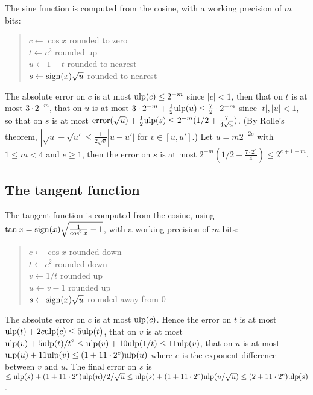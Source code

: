 \documentclass[12pt]{amsart}
\def\ulp{{\rm ulp}}
\begin{document}
The sine function is computed from the cosine, with a working precision of
$m$ bits:
\begin{quote}
$c \leftarrow \cos x$ rounded to zero \\
$t \leftarrow c^2$ rounded up \\
$u \leftarrow 1 - t$ rounded to nearest \\
$s \leftarrow {\rm sign}(x) \sqrt{u}$ rounded to nearest \\
\end{quote}
The absolute error on $c$ is at most $\ulp(c)
\le 2^{-m}$ since $|c| < 1$,
then that on
$t$ is at most $3 \cdot 2^{-m}$, that on $u$ is at most $3 \cdot 2^{-m} + 
\frac{1}{2}\ulp(u) \le \frac{7}{2} \cdot 2^{-m}$
since $|t|, |u| < 1$, so that on $s$ is at most ${\rm error}(\sqrt{u})
 + \frac{1}{2} \ulp(s) \le 2^{-m} (1/2 + \frac{7}{4 \sqrt{u}})$.
(By Rolle's theorem,
$|\sqrt{u} - \sqrt{u'} \le \frac{1}{2 \sqrt{v}} |u-u'|$ for
$v \in [u, u']$.)
Let $u = m 2^{-2e}$ with $1 \le m < 4$ and $e \ge 1$, then 
the error on $s$ is at most $2^{-m} (1/2 + \frac{7 \cdot 2^{e}}{4})
        \le 2^{e + 1 - m}$.

\subsection{The tangent function}

The tangent function is computed from the cosine, 
using $\tan x = {\rm sign}(x) \sqrt{\frac{1}{\cos^2 x} - 1}$,
with a working precision of $m$ bits:
\begin{quote}
$c \leftarrow \cos x$ rounded down \\ %
$t \leftarrow c^2$ rounded down \\    %
$v \leftarrow 1/t$ rounded up \\      %
$u \leftarrow v - 1$ rounded up \\    %
$s \leftarrow {\rm sign}(x) \sqrt{u}$ rounded away from $0$ \\
\end{quote}
The absolute error on $c$ is at most $\ulp(c)$.
Hence the error on
$t$ is at most $\ulp(t) + 2 c \ulp(c) \le 5 \ulp(t)$,
that on $v$ is at most $\ulp(v) + 5 \ulp(t)/t^2
        \le \ulp(v) + 10 \ulp(1/t) \le 11 \ulp(v)$,
that on $u$ is at most $\ulp(u) + 11 \ulp(v) \le (1 + 11 \cdot 2^e) \ulp(u)$
where $e$ is the exponent difference between $v$ and $u$.
The final error on $s$ is $\le \ulp(s) + (1+11 \cdot 2^e) \ulp(u)/2/\sqrt{u}
        \le \ulp(s) + (1+11 \cdot 2^e) \ulp(u/\sqrt{u})
        \le (2 + 11 \cdot 2^e) \ulp(s)$.
\end{document}
